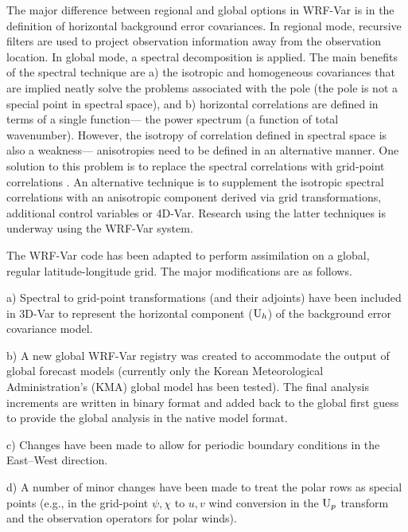 The major difference between regional and global options in WRF-Var is
in the definition of horizontal background error covariances. In
regional mode, recursive filters \citep{purser03} are used to project
observation information away from the observation location. In global
mode, a spectral decomposition is applied. The main benefits of the
spectral technique are a) the isotropic and homogeneous covariances
that are implied neatly solve the problems associated with the pole
(the pole is not a special point in spectral space), and b) horizontal
correlations are defined in terms of a single function--- the power
spectrum (a function of total wavenumber). However, the isotropy of
correlation defined in spectral space is also a weakness---
anisotropies need to be defined in an alternative manner. One solution
to this problem is to replace the spectral correlations with
grid-point correlations \citep{purser03}. An alternative
technique is to supplement the isotropic spectral correlations with an
anisotropic component derived via grid transformations, additional
control variables or 4D-Var. Research using the latter techniques is
underway using the WRF-Var system.

The WRF-Var code has been adapted to perform assimilation on a global, regular 
latitude-longitude grid. The major modifications are as follows.

\vspace{0.5cm}

a) Spectral to grid-point transformations (and their adjoints) have been included in 3D-Var 
to represent the horizontal component (${\rm U}_h$) of the background error covariance 
model.

\vspace{0.5cm}

b) A new global WRF-Var registry was created to accommodate the 
output of global forecast models (currently only the Korean Meteorological 
Administration's (KMA) global model has been tested). 
The final analysis increments are written in binary format and added back to the global 
first guess to provide the global analysis in the native model format.

\vspace{0.5cm}

c) Changes have been made to allow for periodic boundary conditions in the East--West 
direction.

\vspace{0.5cm}

d) A number of minor changes have been made to treat the polar rows as special points 
(e.g., in the grid-point $\psi, \chi$ to $u,v$ wind conversion in the ${\rm U}_p$ transform and the 
observation operators for polar winds).


